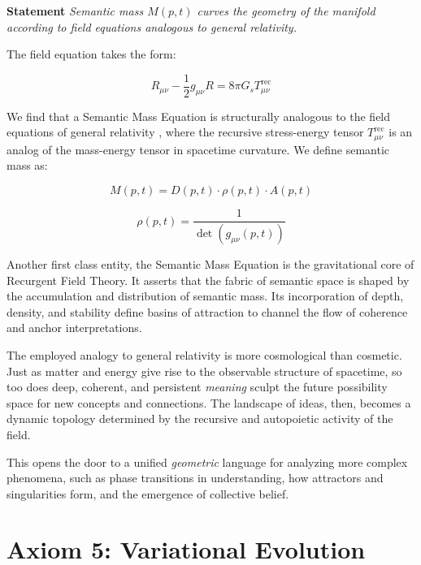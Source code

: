 \textbf{Statement} \textit{Semantic mass \(M(p,t)\) curves the geometry of the manifold according to field equations analogous to general relativity.}

The field equation takes the form:

\begin{equation}
R_{\mu\nu} - \frac{1}{2}g_{\mu\nu}R = 8\pi G_s T^{\text{rec}}_{\mu\nu}
\end{equation}

We find that a Semantic Mass Equation is structurally analogous to the field equations of general relativity \autocite{Einstein1915, MisnerThorneWheeler1973, Wald1984}, where the recursive stress-energy tensor \(T^{\text{rec}}_{\mu\nu}\) is an analog of the mass-energy tensor in spacetime curvature. We define semantic mass as:

\begin{equation}
M(p,t) = D(p,t) \cdot \rho(p,t) \cdot A(p,t)
\end{equation}

\begin{equation}
\rho(p,t) = \frac{1}{\det(g_{\mu\nu}(p,t))}
\end{equation}

Another first class entity, the Semantic Mass Equation is the gravitational core of Recurgent Field Theory. It asserts that the fabric of semantic space is shaped by the accumulation and distribution of semantic mass. Its incorporation of depth, density, and stability define basins of attraction to channel the flow of coherence and anchor interpretations.

The employed analogy to general relativity is more cosmological than cosmetic. Just as matter and energy give rise to the observable structure of spacetime, so too does deep, coherent, and persistent \textit{meaning} sculpt the future possibility space for new concepts and connections. The landscape of ideas, then, becomes a dynamic topology determined by the recursive and autopoietic activity of the field.

This opens the door to a unified \textit{geometric} language for analyzing more complex phenomena, such as phase transitions in understanding, how attractors and singularities form, and the emergence of collective belief.


\section{Axiom 5: Variational Evolution}
\label{1.5:axiom_5_variational_evolution}

